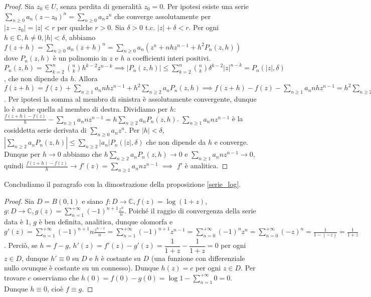 \begin{proof}
  Sia $z_0 \in U$, senza perdita di generalità $z_0=0$. Per ipotesi esiste una serie $\displaystyle \sum_{n \ge 0} a_n(z-z_0)^n=\sum_{n \ge 0} a_nz^n$ che converge assolutamente per $|z-z_0|=|z|<r$ per qualche $r>0$. Sia $\delta>0$ t.c. $|z|+\delta<r$.
  Per ogni $h \in \mathbb{C}, h\not=0, |h|<\delta$, abbiamo $\displaystyle f(z+h)=\sum_{n \ge 0} a_n(z+h)^n=\sum_{n \ge 0} a_n(z^n+nhz^{n-1}+h^2P_n(z, h))$ dove $P_n(z, h)$ è un polinomio in $z$ e $h$ a coefficienti interi positivi.
  $\displaystyle P_n(z, h)=\sum_{k=2}^n \binom{n}{k}h^{k-2}z^{n-k} \implies |P_n(z, h)| \le \sum_{k=2}^n \binom{n}{k} \delta^{k-2}|z|^{n-k}=P_n(|z|, \delta)$, che non dipende da $h$.
  Allora $\displaystyle f(z+h)=f(z)+\sum_{n \ge 1} a_nnhz^{n-1}+h^2\sum_{n \ge 2}a_nP_n(z, h) \implies f(z+h)-f(z)-\sum_{n \ge 1} a_nnhz^{n-1}=h^2\sum_{n \ge 2} a_nP_n(z, h)$. Per ipotesi la somma al membro di sinistra è assolutamente convergente, dunque lo è anche quella al membro di destra.
  Dividiamo per $h$: $\displaystyle \frac{f(z+h)-f(z)}{h}-\sum_{n \ge 1}a_nnz^{n-1}=h\sum_{n \ge 2} a_nP_n(z, h)$. $\displaystyle \sum_{n \ge 1}a_nnz^{n-1}$ è la cosiddetta serie derivata di $\displaystyle \sum_{n \ge 0}a_nz^n$.
  Per $|h|<\delta$, $\displaystyle \left|\sum_{n \ge 2} a_nP_n(z, h)\right| \le \sum_{n \ge 2} |a_n|P_n(|z|, \delta)$ che non dipende da $h$ e converge.
  Dunque per $h \longrightarrow 0$ abbiamo che $\displaystyle h\sum_{n \ge 2} a_nP_n(z, h) \longrightarrow 0$ e $\displaystyle \sum_{n \ge 1} a_nnz^{n-1} \longrightarrow 0$, quindi $\displaystyle \frac{f(z+h)-f(z)}{h} \longrightarrow f'(z)=\sum_{n \ge 1} a_nnz^{n-1}$ $\implies$ $f'$ è analitica.
\end{proof}

Concludiamo il paragrafo con la dimostrazione della proposizione \ref{serie_log}.

\begin{proof}
  Sia $D=B(0, 1)$ e siano $f:D \longrightarrow \mathbb{C}, f(z)=\log(1+z)$, $\displaystyle g:D \longrightarrow \mathbb{C}, g(z)=\sum_{n=1}^{+\infty} (-1)^{n+1}\frac{z^n}{n}$.
  Poiché il raggio di convergenza della serie data è $1$, $g$ è ben definita, analitica, dunque olomorfa e $\displaystyle g'(z)=\sum_{n=1}^{+\infty} (-1)^{n+1}n\frac{z^{n-1}}{n}=\sum_{n=1}^{+\infty} (-1)^{n+1}z^{n-1}=\sum_{n=0}^{+\infty} (-1)^nz^n=\sum_{n=0}^{+\infty} (-z)^n=\frac{1}{1-(-z)}=\frac{1}{1+z}$.
  Perciò, se $h=f-g$, $h'(z)=f'(z)-g'(z)=\dfrac{1}{1+z}-\dfrac{1}{1+z}=0$ per ogni $z \in D$, dunque $h' \equiv 0$ su $D$ e $h$ è costante su $D$ (una funzione con differenziale nullo ovunque è costante su un connesso). Dunque $h(z)=c$ per ogni $z \in D$.
  Per trovare $c$ osserviamo che $\displaystyle h(0)=f(0)-g(0)=\log{1}-\sum_{n=1}^{+\infty} 0=0$. Dunque $h \equiv 0$, cioè $f \equiv g$.
\end{proof}
